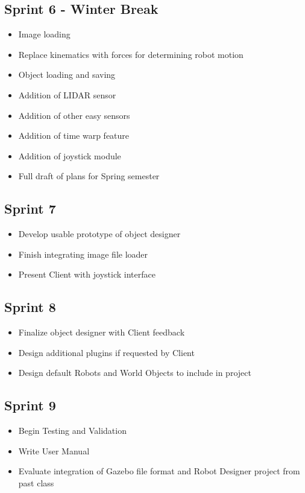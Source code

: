 \subsection{Sprint 6 - Winter Break}
\begin{itemize}
	\item Image loading
	\item Replace kinematics with forces for determining robot motion
 	\item Object loading and saving
 	\item Addition of LIDAR sensor
 	\item Addition of other easy sensors
 	\item Addition of time warp feature
 	\item Addition of joystick module
 	\item Full draft of plans for Spring semester
\end{itemize}

\subsection{Sprint 7}
\begin{itemize}
	\item Develop usable prototype of object designer
	\item Finish integrating image file loader
	\item Present Client with joystick interface
\end{itemize}

\subsection{Sprint 8}
\begin{itemize}
	\item Finalize object designer with Client feedback
	\item Design additional plugins if requested by Client
	\item Design default Robots and World Objects to include in project
\end{itemize}

\subsection{Sprint 9}
\begin{itemize}
	\item Begin Testing and Validation
	\item Write User Manual
	\item Evaluate integration of Gazebo file format and Robot Designer project from past class
\end{itemize}

